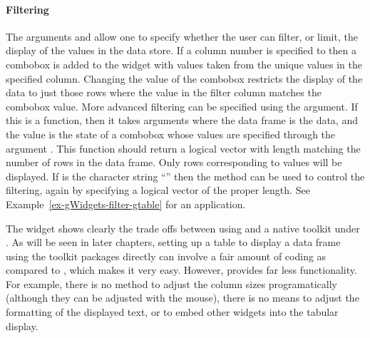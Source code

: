 \paragraph{Filtering}
The arguments  and
 allow one to specify whether the user
can filter, or limit, the display of the values in the data store. If
a column number is specified to  then a combobox
is added to the widget with values taken from the unique values in the
specified column. Changing the value of the combobox restricts the
display of the data to just those rows where the value in the filter
column matches the combobox value. More advanced filtering can be
specified using the  argument. If this is
a function, then it takes arguments 
where the data frame is the data, and the  value is
the state of a combobox whose values are specified through the
argument . This function should return
a logical vector with length matching the number of rows in the data
frame.  Only rows corresponding to  values will be
displayed. If  is the character string
``'' then the  method can
be used to control the filtering, again by specifying a logical vector
of the proper length. See Example~\ref{ex-gWidgets-filter-gtable} for
an application.


The  widget shows clearly the trade offs between
using  and a native toolkit under \R. As will be seen in
later chapters, setting up a table to display a data frame using the
toolkit packages directly can involve a fair amount of coding as
compared to , which makes it very easy. However,
 provides far less functionality. For example, there is
no method to adjust the column sizes programatically (although they
can be adjusted with the mouse), there is no means to adjust the
formatting of the displayed text, or to embed other widgets into the
tabular display.

